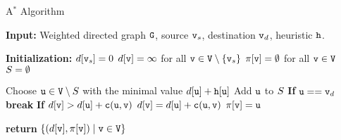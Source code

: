 






\begin{algorithm}
\caption{A$^*$ Algorithm}
\label{Alg:ASTAR}
\begin{algorithmic}[1]
\State \textbf{Input:} Weighted directed graph ${\tt G}$, source ${\tt v}_s$, destination ${\tt v}_d$,  heuristic ${\tt h}$.

\State \textbf{Initialization:} 
\State \quad $d[{\tt v}_s] = 0$
\State \quad $d[{\tt v}] = \infty$ for all ${\tt v} \in {\tt V} \setminus \{{\tt v}_s\}$
\State \quad $\pi[{\tt v}] = \emptyset$ for all ${\tt v} \in {\tt V}$
\State \quad ${S} = \emptyset$

\While{$\vertexset \neq \nodes$}
    \State Choose ${\tt u} \in {\tt V} \setminus {S}$ with the minimal value \textcolor{blue}{$d[{\tt u}] + {\tt h}[{\tt u}]$}
    \State Add ${\tt u}$ to ${S}$
    \State \textbf{If} {${\tt u} == {\tt v}_d$}
        \State \quad \textbf{break}
    \ForAll{$(\nodeu, \nodev) \in \edges$}
        \State \textbf{If} {$d[{\tt v}] > d[{\tt u}] + {\tt c}({\tt u}, {\tt v})$}
            \State \quad $d[{\tt v}] = d[{\tt u}] + {\tt c}({\tt u}, {\tt v})$
            \State \quad $\pi[{\tt v}] = {\tt u}$
    \EndFor
\EndWhile

\State \textbf{return} $\{(d[{\tt v}], \pi[{\tt v}]) \mid {\tt v} \in {\tt V}\}$
\end{algorithmic}
\end{algorithm}


